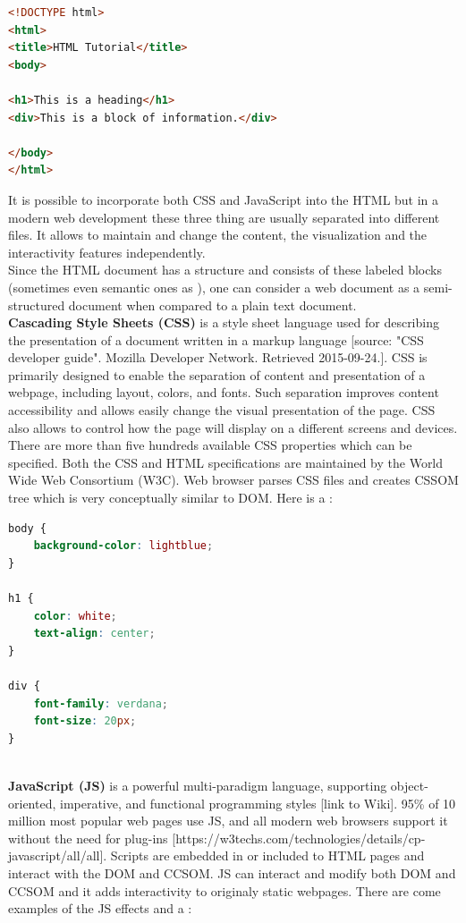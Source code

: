 \begin{lstlisting}[language=html, caption={Small example of HTML file}, label={lst:html}, captionpos=b]
<!DOCTYPE html>
<html>
<title>HTML Tutorial</title>
<body>

<h1>This is a heading</h1>
<div>This is a block of information.</div>

</body>
</html>
\end{lstlisting}

It is possible to incorporate both CSS and JavaScript into the HTML but in a modern web development these three thing are usually separated into different files. It allows to maintain and change the content, the visualization and the interactivity features independently.\\

Since the HTML document has a structure and consists of these labeled blocks (sometimes even semantic ones as ), one can consider a web document as a semi-structured document when compared to a plain text document.\\

\noindent\textbf{Cascading Style Sheets (CSS)} is a style sheet language used for describing the presentation of a document written in a markup language [source: "CSS developer guide". Mozilla Developer Network. Retrieved 2015-09-24.]. CSS is primarily designed to enable the separation of content and presentation of a webpage, including layout, colors, and fonts. Such separation improves content accessibility and allows easily change the visual presentation of the page. CSS also allows to control how the page will display on a different screens and devices. There are more than five hundreds available CSS properties which can be specified. Both the CSS and HTML specifications are maintained by the World Wide Web Consortium (W3C). Web browser parses CSS files and creates CSSOM tree which is very conceptually similar to DOM. Here is a : \\

\begin{lstlisting}[language=css, caption={Small example of CSS file}, label={lst:css}, captionpos=b]
body {
    background-color: lightblue;
}

h1 {
    color: white;
    text-align: center;
}

div {
    font-family: verdana;
    font-size: 20px;
}
\end{lstlisting}\\

\noindent\textbf{JavaScript (JS)} is a powerful multi-paradigm language, supporting object-oriented, imperative, and functional programming styles [link to Wiki]. 95\% of 10 million most popular web pages use JS, and all modern web browsers support it without the need for plug-ins [https://w3techs.com/technologies/details/cp-javascript/all/all]. Scripts are embedded in or included to HTML pages and interact with the DOM and CCSOM. JS can interact and modify both DOM and CCSOM and it adds interactivity to originaly static webpages. There are come examples of the JS effects and a :

